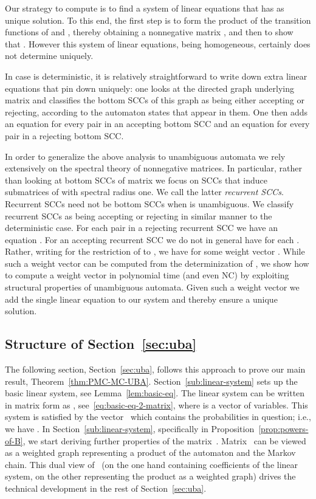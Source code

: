 \documentclass{elsarticle}
\begin{document}
Our strategy to compute  is to find a system of linear
equations that has  as unique solution.  To this end, the
first step is to form the product of the transition functions of 
and , thereby obtaining a nonnegative matrix
, and then to show that
  .  However this system of linear equations, being
  homogeneous, certainly does not determine  uniquely.

In case  is deterministic, it is relatively straightforward to
write down extra linear equations that pin down  uniquely:
one looks at the directed graph underlying matrix  and classifies
the bottom SCCs of this graph as being either accepting or rejecting,
according to the automaton states that appear in them.  One then adds
an equation  for every pair  in an accepting
  bottom SCC and an equation  for every pair 
    in a rejecting bottom SCC.

In order to generalize the above analysis to unambiguous automata we
rely extensively on the spectral theory of nonnegative matrices.  In
particular, rather than looking at bottom SCCs of matrix  we focus
on SCCs that induce submatrices of  with spectral radius one.  We
call the latter \emph{recurrent SCCs}.  Recurrent SCCs need not be
bottom SCCs when  is unambiguous. We classify recurrent SCCs as
being accepting or rejecting in similar manner to the deterministic
case.  For each pair  in a rejecting recurrent SCC we have an
equation .  For an accepting recurrent SCC
 we do not in general have 
for each .  Rather, writing  for the
restriction of  to , we have 
for some weight vector .  While such a weight
vector can be computed from the determinization of , we show how
to compute a weight vector in polynomial time (and even NC) by
exploiting structural properties of unambiguous automata.  Given such
a weight vector  we add the single linear equation
 to our system and thereby ensure a
unique	solution.

\subsection{Structure of Section~\ref{sec:uba}}
The following section, Section~\ref{sec:uba}, follows this approach to prove our main result, Theorem~\ref{thm:PMC-MC-UBA}.
Section~\ref{sub:linear-system} sets up the basic linear system, see Lemma~\ref{lem:basic-eq}.
The linear system can be written in matrix form as , see~\eqref{eq:basic-eq-2-matrix}, where  is a vector of variables.
This system is satisfied by the vector~ which contains the probabilities in question; i.e., we have .
In Section~\ref{sub:linear-system}, specifically in Proposition~\ref{prop:powers-of-B}, we start deriving further properties of the matrix~.
Matrix~ can be viewed as a weighted graph representing a product of the automaton and the Markov chain.
This dual view of~ (on the one hand containing coefficients of the linear system, on the other representing the product as a weighted graph) drives the technical development in the rest of Section~\ref{sec:uba}.
\end{document}
